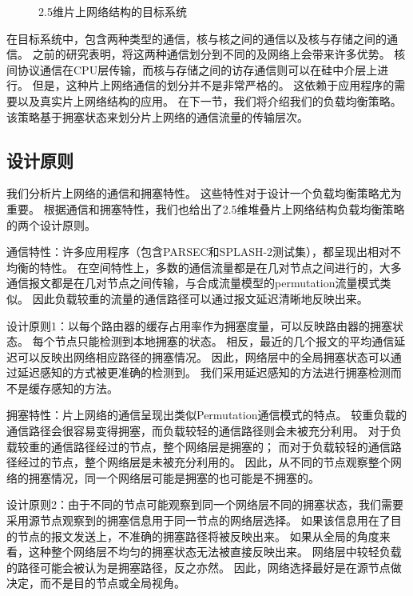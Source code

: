 \begin{figure}[htb]
\centering
{} \qquad
{} \qquad
{}  
\caption{2.5维片上网络结构的目标系统}
\label{fig:target_system}
\end{figure}

在目标系统中，包含两种类型的通信，核与核之间的通信以及核与存储之间的通信。
之前的研究表明，将这两种通信划分到不同的及网络上会带来许多优势。
核间协议通信在CPU层传输，而核与存储之间的访存通信则可以在硅中介层上进行。
但是，这种片上网络通信的划分并不是非常严格的。
这依赖于应用程序的需要以及真实片上网络结构的应用。
在下一节，我们将介绍我们的负载均衡策略。
该策略基于拥塞状态来划分片上网络的通信流量的传输层次。


\subsection{设计原则}

我们分析片上网络的通信和拥塞特性。
这些特性对于设计一个负载均衡策略尤为重要。
根据通信和拥塞特性，我们也给出了2.5维堆叠片上网络结构负载均衡策略的两个设计原则。

通信特性：许多应用程序（包含PARSEC和SPLASH-2测试集），都呈现出相对不均衡的特性。
在空间特性上，多数的通信流量都是在几对节点之间进行的，大多通信报文都是在几对节点之间传输，与合成流量模型的permutation流量模式类似。
因此负载较重的流量的通信路径可以通过报文延迟清晰地反映出来。

设计原则1：以每个路由器的缓存占用率作为拥塞度量，可以反映路由器的拥塞状态。
每个节点只能检测到本地拥塞的状态。
相反，最近的几个报文的平均通信延迟可以反映出网络相应路径的拥塞情况。
因此，网络层中的全局拥塞状态可以通过延迟感知的方式被更准确的检测到。
我们采用延迟感知的方法进行拥塞检测而不是缓存感知的方法。

拥塞特性：片上网络的通信呈现出类似Permutation通信模式的特点。
较重负载的通信路径会很容易变得拥塞，而负载较轻的通信路径则会未被充分利用。
对于负载较重的通信路径经过的节点，整个网络层是拥塞的；
而对于负载较轻的通信路径经过的节点，整个网络层是未被充分利用的。
因此，从不同的节点观察整个网络的拥塞情况，同一个网络层可能是拥塞的也可能是不拥塞的。

设计原则2：由于不同的节点可能观察到同一个网络层不同的拥塞状态，我们需要采用源节点观察到的拥塞信息用于同一节点的网络层选择。
如果该信息用在了目的节点的报文发送上，不准确的拥塞路径将被反映出来。
如果从全局的角度来看，这种整个网络层不均匀的拥塞状态无法被直接反映出来。
网络层中较轻负载的路径可能会被认为是拥塞路径，反之亦然。
因此，网络选择最好是在源节点做决定，而不是目的节点或全局视角。

